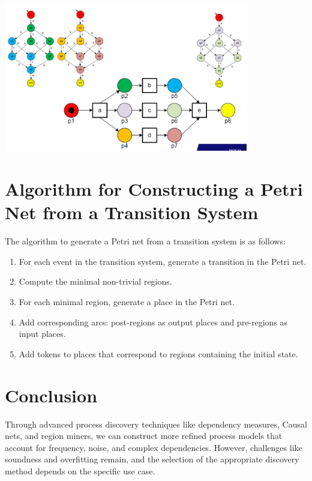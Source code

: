 \begin{center}
    \includegraphics[width=0.8\textwidth]{capitolo 6/6 region 2.png} %
\end{center}

\section{Algorithm for Constructing a Petri Net from a Transition System}

The algorithm to generate a Petri net from a transition system is as follows:
\begin{enumerate}
    \item For each event in the transition system, generate a transition in the Petri net.
    \item Compute the minimal non-trivial regions.
    \item For each minimal region, generate a place in the Petri net.
    \item Add corresponding arcs: post-regions as output places and pre-regions as input places.
    \item Add tokens to places that correspond to regions containing the initial state.
\end{enumerate}

\section{Conclusion}
Through advanced process discovery techniques like dependency measures, Causal nets, and region miners, we can construct more refined process models that account for frequency, noise, and complex dependencies. However, challenges like soundness and overfitting remain, and the selection of the appropriate discovery method depends on the specific use case.


